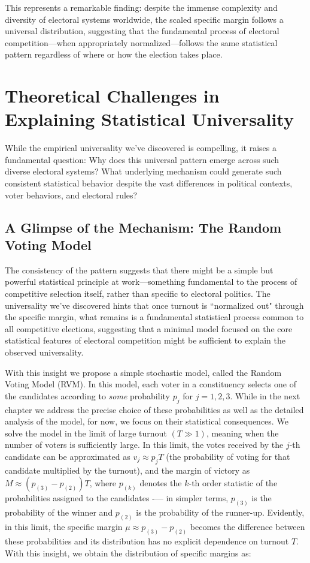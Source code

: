 This represents a remarkable finding: despite the immense complexity and diversity of electoral systems worldwide, the scaled specific margin follows a universal distribution, suggesting that the fundamental process of electoral competition—when appropriately normalized—follows the same statistical pattern regardless of where or how the election takes place.

\section{Theoretical Challenges in Explaining Statistical Universality}

While the empirical universality we've discovered is compelling, it raises a fundamental question: Why does this universal pattern emerge across such diverse electoral systems? What underlying mechanism could generate such consistent statistical behavior despite the vast differences in political contexts, voter behaviors, and electoral rules?

\subsection{A Glimpse of the Mechanism: The Random Voting Model}

The consistency of the pattern suggests that there might be a simple but powerful statistical principle at work—something fundamental to the process of competitive selection itself, rather than specific to electoral politics. The universality we've discovered hints that once turnout is ``normalized out" through the specific margin, what remains is a fundamental statistical process common to all competitive elections, suggesting that a minimal model focused on the core statistical features of electoral competition might be sufficient to explain the observed universality.

With this insight we propose a simple stochastic model, called the Random Voting Model (RVM). In this model, each voter in a constituency selects one of the candidates according to \emph{some} probability $p_j$ for $j=1,2,3$. While in the next chapter we address the precise choice of these probabilities as well as the detailed analysis of the model, for now, we focus on their statistical consequences. We solve the model in the limit of large turnout $(T \gg 1)$, meaning when the number of voters is sufficiently large. In this limit, the votes received by the $j$-th candidate can be approximated as $v_j \approx p_jT$ (the probability of voting for that candidate multiplied by the turnout), and the margin of victory as $M \approx \left(p_{(3)} - p_{(2)}\right) T$, where $p_{(k)}$ denotes the $k$-th order statistic \cite{BarBalNag2008} of the probabilities assigned to the candidates -— in simpler terms, $p_{(3)}$ is the probability of the winner and $p_{(2)}$ is the probability of the runner-up. Evidently, in this limit, the specific margin $\mu \approx p_{(3)} - p_{(2)}$ becomes the difference between these probabilities and its distribution has no explicit dependence on turnout $T$. With this insight, we obtain the distribution of specific margins as:

